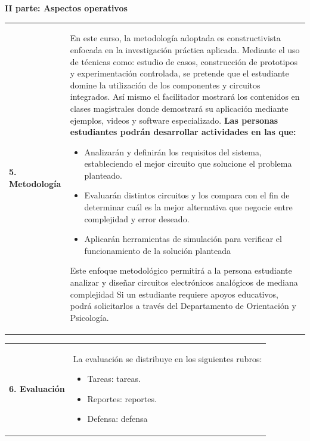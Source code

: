 \documentclass[letterpaper]{article}%
\begin{document}
\newpage%
\par\fontsize{14}{0}\selectfont \textbf{\textcolor{parte}{II parte: Aspectos operativos}}%
\vspace*{4mm}%
\newline%
\fontsize{10}{12}\selectfont %
\begin{tabularx}{\textwidth}{p{3cm}p{13cm}}%
\par\fontsize{12}{14}\selectfont \textbf{\textcolor{parte}{5. Metodología}}&En este curso, la metodología adoptada es constructivista enfocada en la investigación práctica aplicada. Mediante el uso de técnicas como:  estudio de casos, construcción de prototipos y experimentación controlada, se pretende que el estudiante domine la utilización de los componentes y circuitos integrados. Así mismo el facilitador mostrará los contenidos en clases magistrales donde demostrará su aplicación mediante ejemplos, videos y software especializado. \newline\newline \textbf{Las personas estudiantes podrán desarrollar actividades en las que:} \newline\begin{itemize}\item Analizarán y definirán los requisitos del sistema, estableciendo el mejor circuito que solucione el problema planteado.\item Evaluarán distintos circuitos y los compara con el fin de determinar cuál es la mejor alternativa que negocie entre complejidad y error deseado.\item Aplicarán herramientas de simulación para verificar el funcionamiento de la solución planteada\end{itemize}\vspace*{2mm}Este enfoque metodológico permitirá a la persona estudiante analizar y diseñar circuitos electrónicos analógicos de mediana complejidad\vspace*{2mm} \newline  Si un estudiante requiere apoyos educativos, podrá solicitarlos a través del Departamento de Orientación y Psicología. \newline \\%
\end{tabularx}%
\vspace*{2mm}%
\newline%
\begin{tabularx}{\textwidth}{p{3cm}p{13cm}}%
\par\fontsize{12}{14}\selectfont \textbf{\textcolor{parte}{6. Evaluación}}&La evaluación se distribuye en los siguientes rubros: \newline \begin{itemize} \item Tareas: tareas. \item Reportes: reportes. \item Defensa: defensa \end{itemize}\\%
\end{tabularx}%
\end{document}
